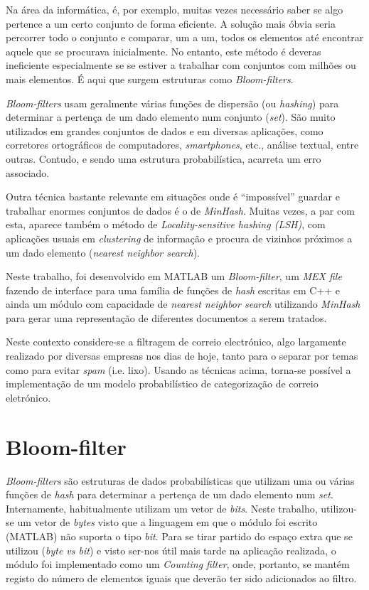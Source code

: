 \documentclass[a4paper,11pt,openright,oneside]{report}
\begin{document}
Na área da informática, é, por exemplo, muitas vezes necessário saber se algo pertence a um certo conjunto de forma eficiente. A solução mais óbvia seria percorrer todo o conjunto e comparar, um a um, todos os elementos até encontrar aquele que se procurava inicialmente. No entanto, este método é deveras ineficiente especialmente se se estiver a trabalhar com conjuntos com milhões ou mais elementos. É aqui que surgem estruturas como \textit{Bloom-filters}. 

\textit{Bloom-filters} usam geralmente várias funções de dispersão (ou \textit{hashing}) para determinar a pertença de um dado elemento num conjunto (\textit{set}). São muito utilizados em grandes conjuntos de dados e em diversas aplicações, como corretores ortográficos de computadores, \textit{smartphones}, etc., análise textual, entre outras. Contudo, e sendo uma estrutura probabilística, acarreta um erro associado.

Outra técnica bastante relevante em situações onde é ``impossível'' guardar e trabalhar enormes conjuntos de dados é o de \textit{MinHash}. Muitas vezes, a par com esta, aparece também o método de \textit{Locality-sensitive hashing (LSH)}, com aplicações usuais em \textit{clustering} de informação e procura de vizinhos próximos a um dado elemento (\textit{nearest neighbor search}).

Neste trabalho, foi desenvolvido em MATLAB um \textit{Bloom-filter}, um \textit{MEX file} fazendo de interface para uma família de funções de \textit{hash} escritas em C++ e ainda um módulo com capacidade de \textit{nearest neighbor search} utilizando \textit{MinHash} para gerar uma representação de diferentes documentos a serem tratados.

Neste contexto considere-se a filtragem de correio electrónico, algo largamente realizado por diversas empresas nos dias de hoje, tanto para o separar por temas como para evitar \textit{spam} (i.e. lixo). Usando as técnicas acima, torna-se possível a implementação de um modelo probabilístico de categorização de correio eletrónico.

\chapter{Bloom-filter}
\label{chap.bloom}

\textit{Bloom-filters} são estruturas de dados probabilísticas que utilizam uma ou várias funções de \textit{hash} para determinar a pertença de um dado elemento num \textit{set}. Internamente, habitualmente utilizam um vetor de \textit{bits}. Neste trabalho, utilizou-se um vetor de \textit{bytes} visto que a linguagem em que o módulo foi escrito (MATLAB) não suporta o tipo \textit{bit}. Para se tirar partido do espaço extra que se utilizou (\textit{byte vs bit}) e visto ser-nos útil mais tarde na aplicação realizada, o módulo foi implementado como um \textit{Counting filter}, onde, portanto, se mantém registo do número de elementos iguais que deverão ter sido adicionados ao filtro.
\end{document}
